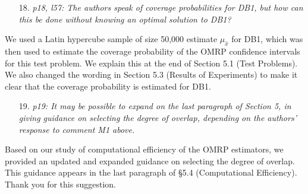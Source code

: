 \documentclass[11pt,notitlepage,onecolumn]{article}
\begin{document}
\begin{itemize}
\item[18.] \textit{p18, l57: The authors speak of coverage probabilities for DB1, but how can this be done without knowing an optimal solution to DB1?}
\end{itemize}

\noindent 
We used a Latin hypercube sample of size 50,000 estimate $\mu_{\hat{x}}$ for DB1, which was then used to estimate the coverage probability of the OMRP confidence intervals for this test problem.
We explain this at the end of Section 5.1 (Test Problems). 
We also changed the wording in Section 5.3 (Results of Experiments) to make it clear that the coverage probability is estimated for DB1. 
\medskip 


\begin{itemize}
\item[19.] \textit{p19: It may be possible to expand on the last paragraph of Section 5, in giving guidance on selecting the degree of overlap, depending on the authors' response to comment M1 above.}
\end{itemize}

\noindent 
Based on our study of computational efficiency of the OMRP estimators, we  provided an updated and expanded guidance on selecting the degree of overlap. 
This guidance appears in the last paragraph of \S 5.4 (Computational Efficiency). 
Thank you for this suggestion. 
\end{document}
